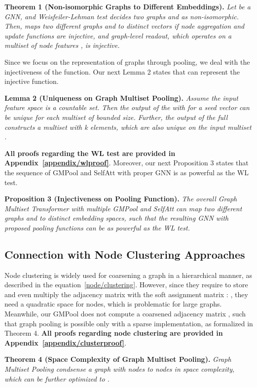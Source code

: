 \documentclass{article} \usepackage{iclr2021_conference,times}
\begin{document}
\textbf{Theorem 1 (Non-isomorphic Graphs to Different Embeddings).} \emph{Let  be a GNN, and Weisfeiler-Lehman test decides two graphs  and  as non-isomorphic. Then,  maps two different graphs  and  to distinct vectors if node aggregation and update functions are injective, and graph-level readout, which operates on a multiset of node features , is injective.}

Since we focus on the representation of graphs through pooling, we deal with the injectiveness of the  function. Our next Lemma 2 states that  can represent the injective function. 

\textbf{Lemma 2 (Uniqueness on Graph Multiset Pooling).} \emph{Assume the input feature space  is a countable set. Then the output of the  with  for a seed vector  can be unique for each multiset  of bounded size. Further, the output of the full  constructs a multiset with k elements, which are also unique on the input multiset .}

\textbf{All proofs regarding the WL test are provided in Appendix~\ref{appendix/wlproof}}. Moreover, our next Proposition 3 states that the sequence of GMPool and SelfAtt with proper GNN is as powerful as the WL test.

\textbf{Proposition 3 (Injectiveness on Pooling Function).} 
\emph{The overall Graph Multiset Transformer with multiple GMPool and SelfAtt can map two different graphs  and  to distinct embedding spaces, such that the resulting GNN with proposed pooling functions can be as powerful as the WL test.}

\subsection{Connection with Node Clustering Approaches \label{paragraph/node/clustering}}
Node clustering is widely used for coarsening a graph in a hierarchical manner, as described in the equation~\ref{node/clustering}. However, since they require to store and even multiply the adjacency matrix  with the soft assignment matrix : , they need a quadratic space  for  nodes, which is problematic for large graphs. Meanwhile, our GMPool does not compute a coarsened adjacency matrix , such that graph pooling is possible only with a sparse implementation, as formalized in Theorem 4. \textbf{All proofs regarding node clustering are provided in Appendix~\ref{appendix/clusterproof}}.

\textbf{Theorem 4 (Space Complexity of Graph Multiset Pooling).} \emph{Graph Multiset Pooling condsense a graph with  nodes to  nodes in  space complexity, which can be further optimized to .}
\end{document}
